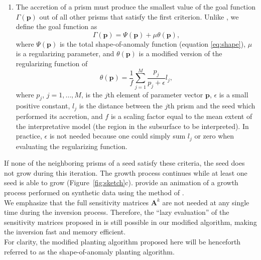 \documentclass[twocolumn,final]{svjour3}
\newcommand{\vect}[1]{\mathbf{#1}}
\newcommand{\mat}[1]{\mathbf{#1}}
\begin{document}
\begin{sloppypar}
\begin{enumerate}
    \item The accretion of a prism must produce the smallest value of the goal
    function $\Gamma(\vect{p})$ out of all other prisms that satisfy the first
    criterion. Unlike \citet{uieda_planting}, we define the goal function as
    \begin{equation}
        \Gamma(\vect{p}) = \Psi(\vect{p}) + \mu\theta(\vect{p}),
        \label{eq:goal}
    \end{equation}
    where $\Psi(\vect{p})$ is the total shape-of-anomaly function (equation
    \ref{eq:shape}), $\mu$ is a regularizing parameter, and $\theta(\vect{p})$
    is a modified version of the regularizing function of \citet{uieda_planting}
    \begin{equation}
        \theta(\vect{p}) = \frac{1}{f} \sum\limits_{j=1}^{M}
        \dfrac{p_j}{p_j + \epsilon} l_{j},
        \label{eq:regul}
    \end{equation}
    where $p_{j}$, $j=1,\ldots,M$, is the $j$th element of parameter vector
    $\vect{p}$,
    $\epsilon$ is a small positive constant, $l_{j}$ is the distance between the
    $j$th prism and the seed which performed its accretion, and $f$ is a scaling
    factor equal to the mean extent of the interpretative model
    (the region in the subsurface to be interpreted).
    In practice, $\epsilon$ is not needed because one could simply sum $l_{j}$
    or zero when evaluating the regularizing function.
\end{enumerate}

If none of the neighboring prisms of a seed satisfy these criteria, the
seed does not grow during this iteration.
The growth process continues while at least one seed is able to grow
(Figure~\ref{fig:sketch}c).
\citet{uieda_animation} provide an animation of a growth process performed on
synthetic data using the method of \citet{uieda_planting}.
\\[0.2cm]
We emphasize that the full sensitivity matrices $\mat{A}^{k}$ are not needed
at any single time during the inversion process.
Therefore, the ``lazy evaluation'' of the sensitivity matrices
proposed in \citet{uieda_planting} is still possible
in our modified algorithm, making the inversion fast and memory efficient.
\\[0.2cm]
For clarity, the modified planting algorithm proposed here will be henceforth
referred to as the shape-of-anomaly planting algorithm.
\end{sloppypar}
\end{document}
